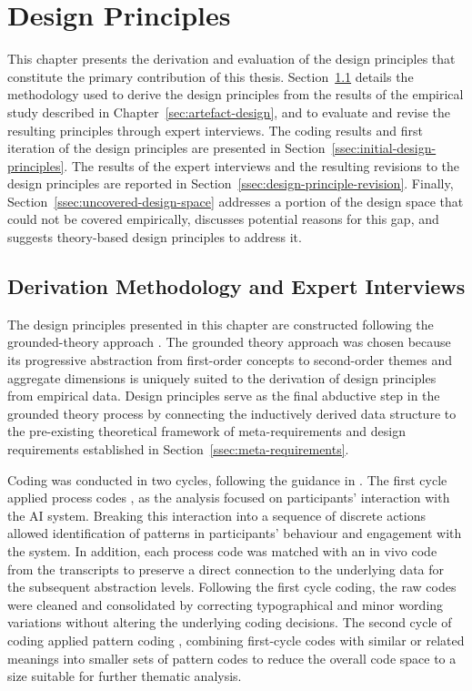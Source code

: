 \section{Design Principles} \label{sec:design-principles}

This chapter presents the derivation and evaluation of the design principles that constitute the primary contribution of this thesis. Section~\ref{ssec:derivation-methods} details the methodology used to derive the design principles from the results of the empirical study described in Chapter~\ref{sec:artefact-design}, and to evaluate and revise the resulting principles through expert interviews. The coding results and first iteration of the design principles are presented in Section~\ref{ssec:initial-design-principles}. The results of the expert interviews and the resulting revisions to the design principles are reported in Section~\ref{ssec:design-principle-revision}. Finally, Section~\ref{ssec:uncovered-design-space} addresses a portion of the design space that could not be covered empirically, discusses potential reasons for this gap, and suggests theory-based design principles to address it.

\subsection{Derivation Methodology and Expert Interviews} \label{ssec:derivation-methods}

The design principles presented in this chapter are constructed following the grounded-theory approach \parencite{Gioia2013}. The grounded theory approach was chosen because its progressive abstraction from first-order concepts to second-order themes and aggregate dimensions is uniquely suited to the derivation of design principles from empirical data. Design principles serve as the final abductive step in the grounded theory process by connecting the inductively derived data structure to the pre-existing theoretical framework of meta-requirements and design requirements established in Section~\ref{ssec:meta-requirements}.

Coding was conducted in two cycles, following the guidance in \textcite{Saldana2015}. The first cycle applied process codes \parencite{Corbin2014}, as the analysis focused on participants' interaction with the \ac{AI} system. Breaking this interaction into a sequence of discrete actions allowed identification of patterns in participants' behaviour and engagement with the system. In addition, each process code was matched with an in vivo code \parencite{Corbin2014} from the transcripts to preserve a direct connection to the underlying data for the subsequent abstraction levels. Following the first cycle coding, the raw codes were cleaned and consolidated by correcting typographical and minor wording variations without altering the underlying coding decisions. The second cycle of coding applied pattern coding \parencite{Miles2013}, combining first-cycle codes with similar or related meanings into smaller sets of pattern codes to reduce the overall code space to a size suitable for further thematic analysis.

